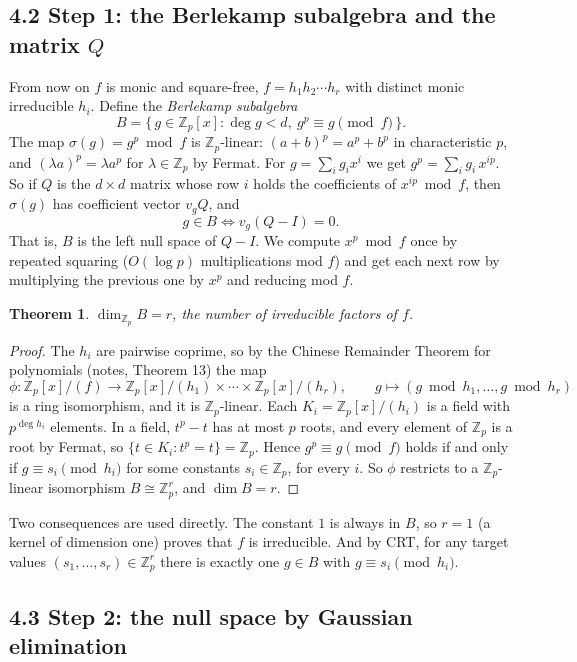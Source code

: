 \documentclass[11pt,a4paper]{article}
\newtheorem{theorem}{Theorem}
\newcommand{\Zp}{\mathbb{Z}_p}
\newcommand{\Zpx}{\mathbb{Z}_p[x]}
\begin{document}
\subsection*{4.2 Step 1: the Berlekamp subalgebra and the matrix $Q$}

From now on $f$ is monic and square-free, $f = h_1 h_2 \cdots h_r$ with distinct monic
irreducible $h_i$. Define the \emph{Berlekamp subalgebra}
\[
  B = \{\, g \in \Zpx : \deg g < d,\ g^p \equiv g \pmod f \,\}.
\]
The map $\sigma(g) = g^p \bmod f$ is $\Zp$-linear: $(a+b)^p = a^p + b^p$ in characteristic $p$, and
$(\lambda a)^p = \lambda a^p$ for $\lambda \in \Zp$ by Fermat. For $g = \sum_i g_i x^i$ we get
$g^p = \sum_i g_i\, x^{ip}$. So if $Q$ is the $d \times d$ matrix whose row $i$ holds the
coefficients of $x^{ip} \bmod f$, then $\sigma(g)$ has coefficient vector $v_g Q$, and
\[
  g \in B \iff v_g (Q - I) = 0 .
\]
That is, $B$ is the left null space of $Q - I$. We compute $x^p \bmod f$ once by repeated
squaring ($O(\log p)$ multiplications mod $f$) and get each next row by multiplying the previous
one by $x^p$ and reducing mod $f$.

\begin{theorem}
\label{thm:dim}
$\dim_{\Zp} B = r$, the number of irreducible factors of $f$.
\end{theorem}

\begin{proof}
The $h_i$ are pairwise coprime, so by the Chinese Remainder Theorem for polynomials
(notes, Theorem 13) the map
\[
  \phi : \Zpx/(f) \to \Zpx/(h_1) \times \cdots \times \Zpx/(h_r), \qquad
  g \mapsto (g \bmod h_1, \dots, g \bmod h_r)
\]
is a ring isomorphism, and it is $\Zp$-linear. Each $K_i = \Zpx/(h_i)$ is a field with
$p^{\deg h_i}$ elements. In a field, $t^p - t$ has at most $p$ roots, and every element of $\Zp$
is a root by Fermat, so $\{t \in K_i : t^p = t\} = \Zp$. Hence $g^p \equiv g \pmod f$ holds if and
only if $g \equiv s_i \pmod{h_i}$ for some constants $s_i \in \Zp$, for every $i$. So $\phi$
restricts to a $\Zp$-linear isomorphism $B \cong \Zp^r$, and $\dim B = r$.
\end{proof}

Two consequences are used directly. The constant $1$ is always in $B$, so $r = 1$ (a kernel of
dimension one) proves that $f$ is irreducible. And by CRT, for any target values
$(s_1, \dots, s_r) \in \Zp^r$ there is exactly one $g \in B$ with $g \equiv s_i \pmod {h_i}$.

\subsection*{4.3 Step 2: the null space by Gaussian elimination}
\end{document}
